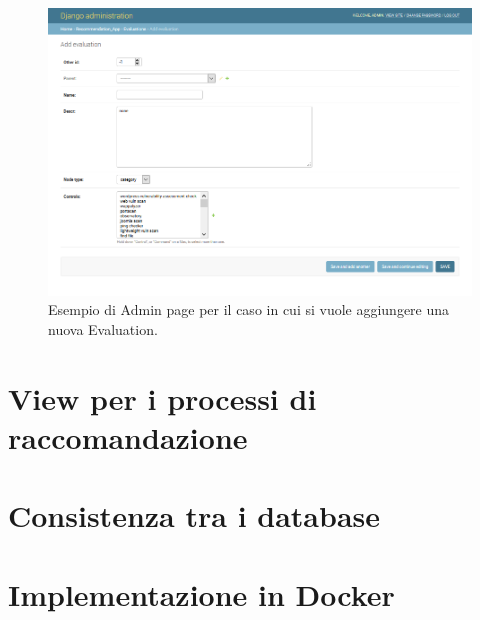 \begin{figure}
    \includegraphics[scale=0.55]{images/MCRS_adminpage_evaluationEX_add.png}
    \caption{Esempio di Admin page per il caso in cui si vuole aggiungere una nuova Evaluation.}
    \label{fig:MCRS_adminpage_evaluationEX_add}
\end{figure}

\section*{View per i processi di raccomandazione}




\section*{Consistenza tra i database}



\section*{Implementazione in Docker}



